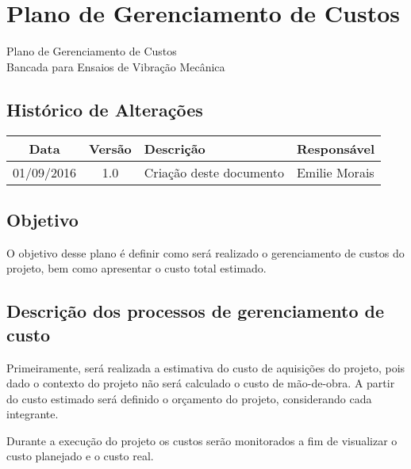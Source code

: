 

\chapter{Plano de Gerenciamento de Custos}
	\label{plano_de_custos}
% 	
    

\begin{center}
 {\large Plano de Gerenciamento de Custos}\\[0.2cm]
 {Bancada para Ensaios de Vibração Mecânica}\\
 \end{center}
 
 \section*{Histórico de Alterações}
\begin{table}[h]
\centering
\begin{tabular}{|c|c|p{6cm}|p{5cm}|}

Data & Versão & Descrição & Responsável\\
\hline                               
01/09/2016 & 1.0 & Criação deste documento & Emilie Morais\\ \hline
\end{tabular}
\end{table}

\section*{Objetivo}
  O objetivo desse plano é definir como será realizado o gerenciamento de custos do projeto, bem como apresentar o custo total estimado.

  
\section*{Descrição dos processos de gerenciamento de custo}

Primeiramente, será realizada a estimativa do custo de aquisições do projeto, pois dado o contexto do projeto não será calculado o custo de mão-de-obra. A partir do custo estimado será definido o orçamento do projeto, considerando cada integrante.

Durante a execução do projeto os custos serão monitorados a fim de visualizar o custo planejado e o custo real.

